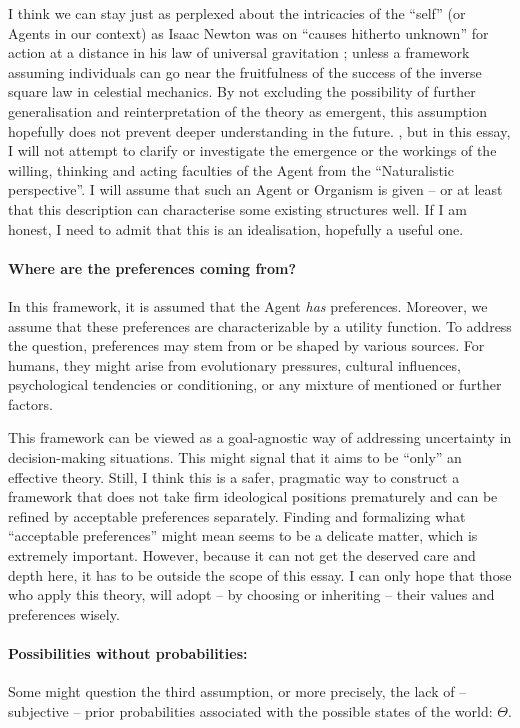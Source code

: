 \documentclass{article}
\begin{document}
{I think we can stay just as perplexed about the intricacies of the ``self'' (or Agents in our context) as Isaac Newton was on ``causes hitherto unknown'' \cite{book:Principia, book:Principia1848, sep:Principia} for action at a distance in his law of universal gravitation \cite{book:CorrespondenceOfIsaacNewton,paper:NewtonOnActionAtADistance}; unless a framework assuming individuals can go near the fruitfulness of the success of the inverse square law in celestial mechanics. By not excluding the possibility of further generalisation and reinterpretation of the theory as emergent, this assumption hopefully does not prevent deeper understanding in the future.
}
, but in this essay, I will not attempt to clarify or investigate the emergence or the workings of the willing, thinking and acting faculties of the Agent from the ``Naturalistic perspective''. I will assume that such an Agent or Organism is given -- or at least that this description can characterise some existing structures well. If I am honest, I need to admit that this is an idealisation, hopefully a useful one.

\paragraph{Where are the preferences coming from?} In this framework, it is assumed that the Agent \emph{has} preferences. Moreover, we assume that these preferences are characterizable by a utility function. To address the question, preferences may stem from or be shaped by various sources. For humans, they might arise from evolutionary pressures, cultural influences, psychological tendencies or conditioning, or any mixture of mentioned or further factors.

This framework can be viewed as a goal-agnostic way of addressing uncertainty in decision-making situations. This might signal that it aims to be ``only'' an effective theory. Still, I think this is a safer, pragmatic way to construct a framework that does not take firm ideological positions prematurely and can be refined by acceptable preferences separately. Finding and formalizing what ``acceptable preferences'' might mean seems to be a delicate matter,  which is extremely important. However, because it can not get the deserved care and depth here, it has to be 
outside the scope of this essay.
I can only hope that those who apply this theory, will adopt -- by choosing or inheriting -- their values and preferences wisely.

\paragraph{Possibilities without probabilities:}
Some might question the third assumption, or more precisely, the lack of – subjective – prior probabilities associated with the possible states of the world: $\Theta$. 
\end{document}
